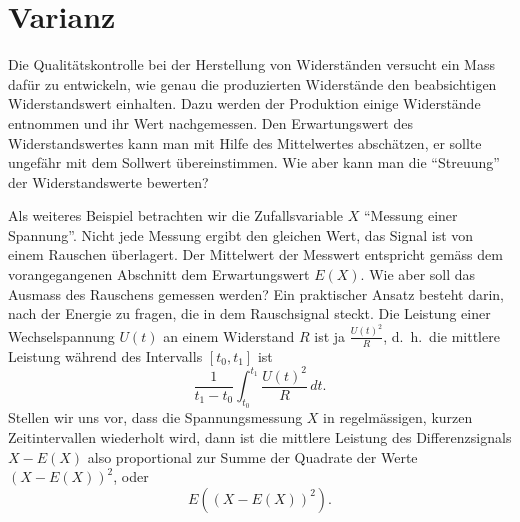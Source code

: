 \section{Varianz}\label{section-varianz}
Die Qualitätskontrolle bei der Herstellung von Widerständen versucht
ein Mass dafür zu entwickeln, wie genau die produzierten Widerstände
den beabsichtigen Widerstandswert einhalten. 
Dazu werden der Produktion einige Widerstände entnommen und ihr Wert
nachgemessen.
Den Erwartungswert des Widerstandswertes kann man mit
Hilfe des Mittelwertes abschätzen, er sollte ungefähr mit dem Sollwert
übereinstimmen.
Wie aber kann man die ``Streuung'' der Widerstandswerte
bewerten?

Als weiteres Beispiel betrachten wir die Zufallsvariable $X$
``Messung einer Spannung''.
Nicht jede Messung ergibt den gleichen Wert,
das Signal ist von einem Rauschen überlagert.
Der Mittelwert der
Messwert entspricht gemäss dem vorangegangenen Abschnitt dem Erwartungswert
$E(X)$.
Wie aber soll das Ausmass des Rauschens gemessen werden?
Ein praktischer Ansatz besteht darin, nach der Energie zu fragen, die
in dem Rauschsignal steckt.
Die Leistung einer Wechselspannung $U(t)$
an einem Widerstand $R$ ist ja
$\frac{U(t)^2}R$, d.~h.~die mittlere Leistung während des Intervalls $[t_0,t_1]$ 
ist
\[
\frac1{t_1-t_0}\int_{t_0}^{t_1}\frac{U(t)^2}R\,dt.
\]
Stellen wir uns vor, dass die Spannungsmessung $X$ in regelmässigen, kurzen
Zeitintervallen wiederholt wird, dann ist die mittlere Leistung
des Differenzsignals $X-E(X)$ also proportional zur Summe der Quadrate
der Werte $(X-E(X))^2$, oder
\[
E((X-E(X))^2).
\]

